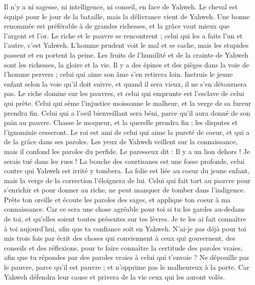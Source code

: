 \begin{multicols}{2}
Il n'y a ni sagesse, ni intelligence, ni conseil, en face de Yahweh.
Le cheval est équipé pour le jour de la bataille, mais la délivrance vient de Yahweh.
\VerseOne{}Une bonne renommée est préférable à de grandes richesses, et la grâce vaut mieux que l'argent et l'or.
Le riche et le pauvre se rencontrent ; celui qui les a faits l’un et l’autre, c'est Yahweh.
L'homme prudent voit le mal et se cache, mais les stupides passent et en portent la peine.
Les fruits de l’humilité et de la crainte de Yahweh sont les richesses, la gloire et la vie.
Il y a des épines et des pièges dans la voie de l’homme pervers ; celui qui aime son âme s'en retirera loin.
Instruis le jeune enfant selon la voie qu’il doit suivre, et quand il sera vieux, il ne s'en détournera pas.
Le riche domine sur les pauvres, et celui qui emprunte est l’esclave de celui qui prête.
Celui qui sème l’injustice moissonne le malheur, et la verge de sa fureur prendra fin.
Celui qui a l'oeil bienveillant sera béni, parce qu'il aura donné de son pain au pauvre.
Chasse le moqueur, et la querelle prendra fin ; les disputes et l'ignominie cesseront.
Le roi est ami de celui qui aime la pureté de coeur, et qui a de la grâce dans ses paroles.
Les yeux de Yahweh veillent sur la connaissance, mais il confond les paroles du perfide.
Le paresseux dit : Il y a un lion dehors ! Je serais tué dans les rues !
La bouche des courtisanes est une fosse profonde, celui contre qui Yahweh est irrité y tombera.
La folie est liée au coeur du jeune enfant, mais la verge de la correction l’éloignera de lui.
Celui qui fait tort au pauvre pour s’enrichir et pour donner au riche, ne peut manquer de tomber dans l'indigence.
Prête ton oreille et écoute les paroles des sages, et applique ton coeur à ma connaissance.
Car ce sera une chose agréable pour toi si tu les gardes au-dedans de toi, et qu’elles soient toutes présentes sur tes lèvres.
Je te les ai fait connaître à toi aujourd’hui, afin que ta confiance soit en Yahweh.
N’ai-je pas déjà pour toi mis trois fois par écrit des choses qui conviennent à ceux qui gouvernent, des conseils et des réflexions,
pour te faire connaître la certitude des paroles vraies, afin que tu répondes par des paroles vraies à celui qui t’envoie ?
Ne dépouille pas le pauvre, parce qu'il est pauvre ; et n’opprime pas le malheureux à la porte.
Car Yahweh défendra leur cause et privera de la vie ceux qui les auront volés.

\end{multicols}
